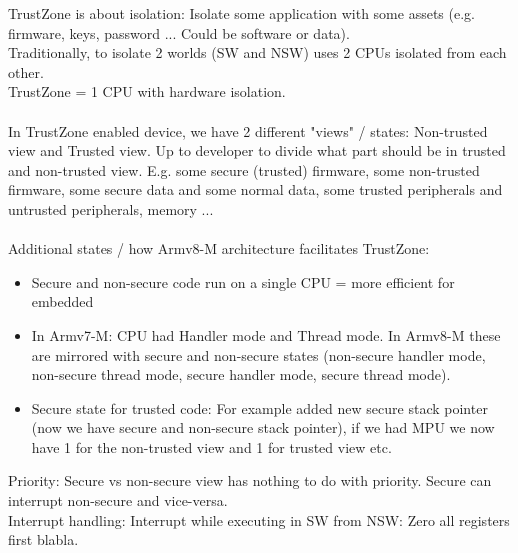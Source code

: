 TrustZone is about isolation: Isolate some application with some assets (e.g. firmware, keys, password ... Could be software or data). \\
Traditionally, to isolate 2 worlds (SW and NSW) uses 2 CPUs isolated from each other. \\
TrustZone = 1 CPU with hardware isolation.
\\
\\
In TrustZone enabled device, we have 2 different "views" / states: Non-trusted view and Trusted view. Up to developer to divide what part should be in trusted and non-trusted view. E.g. some secure (trusted) firmware, some non-trusted firmware, some secure data and some normal data, some trusted peripherals and untrusted peripherals, memory ... 
\\
\\
Additional states / how Armv8-M architecture facilitates TrustZone:
\begin{itemize}
    \item Secure and non-secure code run on a single CPU = more efficient for embedded 
    \item In Armv7-M: CPU had Handler mode and Thread mode. In Armv8-M these are mirrored with secure and non-secure states (non-secure handler mode, non-secure thread mode, secure handler mode, secure thread mode).
    \item Secure state for trusted code: For example added new secure stack pointer (now we have secure and non-secure stack pointer), if we had MPU we now have 1 for the non-trusted view and 1 for trusted view etc.
\end{itemize}
Priority: Secure vs non-secure view has nothing to do with priority. Secure can interrupt non-secure and vice-versa. \\
Interrupt handling: Interrupt while executing in SW from NSW: Zero all registers first blabla.\\
\\

